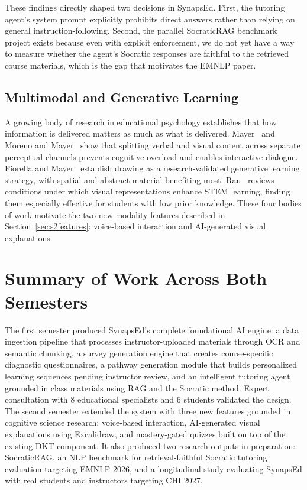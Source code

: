 \documentclass{stylefiles/capstone}
\begin{document}
These findings directly shaped two decisions in SynapsEd. First, the tutoring agent's system prompt explicitly prohibits direct answers rather than relying on general instruction-following. Second, the parallel SocraticRAG benchmark project exists because even with explicit enforcement, we do not yet have a way to measure whether the agent's Socratic responses are faithful to the retrieved course materials, which is the gap that motivates the EMNLP paper.

\subsection{Multimodal and Generative Learning}

A growing body of research in educational psychology establishes that how information is delivered matters as much as what is delivered. Mayer~\cite{mayer2021instructional} and Moreno and Mayer~\cite{moreno2007interactive} show that splitting verbal and visual content across separate perceptual channels prevents cognitive overload and enables interactive dialogue. Fiorella and Mayer~\cite{fiorella2016generative} establish drawing as a research-validated generative learning strategy, with spatial and abstract material benefiting most. Rau~\cite{rau2017visual} reviews conditions under which visual representations enhance STEM learning, finding them especially effective for students with low prior knowledge. These four bodies of work motivate the two new modality features described in Section~\ref{sec:s2features}: voice-based interaction and AI-generated visual explanations.

\section{Summary of Work Across Both Semesters}

The first semester produced SynapsEd's complete foundational AI engine: a data ingestion pipeline that processes instructor-uploaded materials through OCR and semantic chunking, a survey generation engine that creates course-specific diagnostic questionnaires, a pathway generation module that builds personalized learning sequences pending instructor review, and an intelligent tutoring agent grounded in class materials using RAG and the Socratic method. Expert consultation with 8 educational specialists and 6 students validated the design. The second semester extended the system with three new features grounded in cognitive science research: voice-based interaction, AI-generated visual explanations using Excalidraw, and mastery-gated quizzes built on top of the existing DKT component. It also produced two research outputs in preparation: SocraticRAG, an NLP benchmark for retrieval-faithful Socratic tutoring evaluation targeting EMNLP 2026, and a longitudinal study evaluating SynapsEd with real students and instructors targeting CHI 2027.
\end{document}
